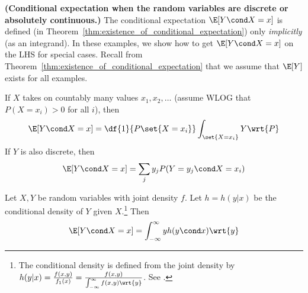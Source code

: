 \documentclass{article} %
\begin{document}
\begin{examples}\textbf{(Conditional expectation when the random variables are discrete or absolutely continuous.)}
The conditional expectation $\E[Y \cond X=x]$ is defined (in Theorem~\ref{thm:existence_of_conditional_expectation}) only \textit{implicitly} (as an integrand).  In these examples, we show how to get 	$\E[Y \cond X=x]$  on the LHS for special cases.   Recall from Theorem~\ref{thm:existence_of_conditional_expectation} that we assume that $\E[Y]$ exists for all examples.

\begin{alphabate}
\item  If $X$ takes on countably many values $x_1, x_2, \hdots$ (assume WLOG that $P(X=x_i)>0$ for all $i$), then 
\begin{align}
\E[Y \cond X=x] = \df{1}{P\set{X=x_i}} \int_{\set{X=x_i}} Y \wrt{P} 
\label{eqn:conditional_expectation_with_discrete_conditioning_variable}
\end{align}
If $Y$ is also discrete, then 
\begin{align}
\E[Y \cond X=x] = \sum_j y_j P(Y=y_j \cond X=x_i)
\label{eqn:conditional_expectation_with_discrete_conditioning_variable_and_discrete_mainvariable}
\end{align}
\item Let $X,Y$ be random variables with joint density $f$.  Let $h=h(y|x)$ be the conditional density of $Y$ given $X$.\footnote{The conditional density is defined from the joint density by $h(y|x) = \frac{f(x,y)}{f_1(x)} = \frac{f(x,y)}{\int_{-\infty}^\infty f(x,y) \wrt{y}}$. See \cite[Sec.~5.3.2]{ash2000probability}.} Then 
\begin{align}
\E[Y \cond X=x] = \int_{-\infty}^\infty y h(y \cond x) \wrt{y}
\label{eqn:conditional_expectation_when_joint_density_exists}
\end{align}
\end{alphabate}
\label{ex:conditional_expectation_with_random_variables_that_are_discrete_or_absolutely_continuous}
\end{examples}
\end{document}
